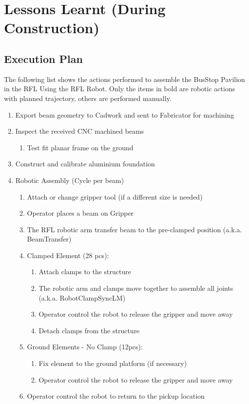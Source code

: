 \section{Lessons Learnt (During Construction)}
\label{section:exploration-2-lessons-learnt-during-construction}

\subsection{Execution Plan}
\label{subsection:exploration-2-execution-plan}

The following list shows the actions performed to assemble the BusStop Pavilion in the RFL Using the RFL Robot. Only the items in bold are robotic actions with planned trajectory, others are performed manually. 
\begin{enumerate}
    \item Export beam geometry to Cadwork and sent to Fabricator for machining
    \item Inspect the received CNC machined beams
    \begin{enumerate}
        \item Test fit planar frame on the ground
    \end{enumerate}
    \item Construct and calibrate aluminium foundation 
    \item Robotic Assembly (Cycle per beam)
    \begin{enumerate}
        \item Attach or change gripper tool (if a different size is needed)
        \item Operator places a beam on Gripper
        \item The RFL robotic arm transfer beam to the pre-clamped position (a.k.a. BeamTransfer)
        \item Clamped Element (28 pcs):
        \begin{enumerate}
            \item Attach clamps to the structure 
            \item The robotic arm and clamps move together to assemble all joints (a.k.a. RobotClampSyncLM)
            \item Operator control the robot to release the gripper and move away
            \item Detach clamps from the structure
        \end{enumerate}
        \item Ground Elements - No Clamp (12pcs):
        \begin{enumerate}
            \item Fix element to the ground platform (if necessary)
            \item Operator control the robot to release the gripper and move away
        \end{enumerate}
        \item Operator control the robot to return to the pickup location 
    \end{enumerate}
\end{enumerate}


